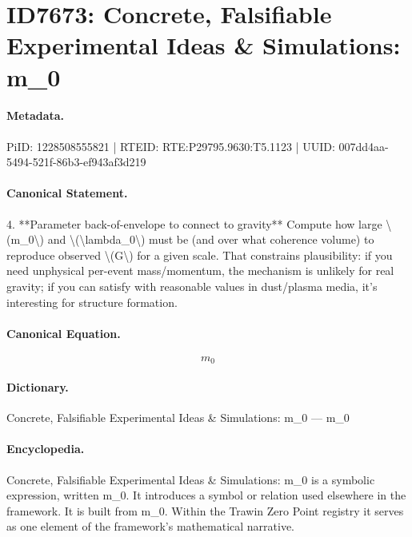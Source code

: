 \section*{ID7673: Concrete, Falsifiable Experimental Ideas \& Simulations: m\_0}
\paragraph{Metadata.}
PiID: 1228508555821 | RTEID: RTE:P29795.9630:T5.1123 | UUID: 007dd4aa-5494-521f-86b3-ef943af3d219

\paragraph{Canonical Statement.}
4. **Parameter back-of-envelope to connect to gravity** Compute how large \textbackslash{}(m\_0\textbackslash{}) and \textbackslash{}(\textbackslash{}lambda\_0\textbackslash{}) must be (and over what coherence volume) to reproduce observed \textbackslash{}(G\textbackslash{}) for a given scale. That constrains plausibility: if you need unphysical per-event mass/momentum, the mechanism is unlikely for real gravity; if you can satisfy with reasonable values in dust/plasma media, it’s interesting for structure formation.

\paragraph{Canonical Equation.}
\[
m_0
\]

\paragraph{Dictionary.}
Concrete, Falsifiable Experimental Ideas \& Simulations: m\_0 — m\_0

\paragraph{Encyclopedia.}
Concrete, Falsifiable Experimental Ideas \& Simulations: m\_0 is a symbolic expression, written m\_0. It introduces a symbol or relation used elsewhere in the framework. It is built from m\_0. Within the Trawin Zero Point registry it serves as one element of the framework's mathematical narrative.
